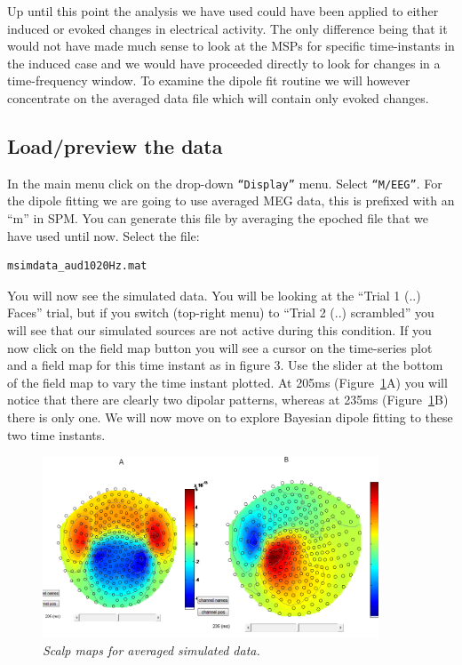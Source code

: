 Up until this point the analysis we have used could have been applied to either induced or evoked changes in electrical activity. The only difference being that it would not have made much sense to look at the MSPs for specific time-instants in the induced case and we would have proceeded directly to look for changes in a time-frequency window. To examine the dipole fit routine we will however concentrate on the averaged data file which will contain only evoked changes.

\subsection{Load/preview the data}

In the main menu click on the drop-down \texttt{``Display''} menu. Select \texttt{``M/EEG''}. For the dipole fitting we are going to use averaged MEG data, this is prefixed with an ``m'' in SPM. You can generate this file by averaging the epoched file that we have used until now. Select the file:

\begin{verbatim}
msimdata_aud1020Hz.mat
\end{verbatim}

You will now see the simulated data. You will be looking at the ``Trial 1 (..) Faces'' trial,  but if you switch (top-right menu) to ``Trial 2 (..) scrambled'' you will see that our simulated sources are not active during this condition.  If you now click on the field map button you will see a cursor on the time-series plot and a field map for this time instant as in figure 3. Use the slider at the bottom of the field map to vary the time instant plotted. At 205ms (Figure~\ref{meg_sloc:fig:14}A) you will notice that there are clearly two dipolar patterns, whereas at 235ms (Figure~\ref{meg_sloc:fig:14}B) there is only one.
We will now move on to explore Bayesian dipole fitting to these two time instants.

\begin{figure}
\begin{center}
\includegraphics[width=100mm]{meg_sloc/slide14}
\caption{\em Scalp maps for averaged simulated data.\label{meg_sloc:fig:14}}
\end{center}
\end{figure}

